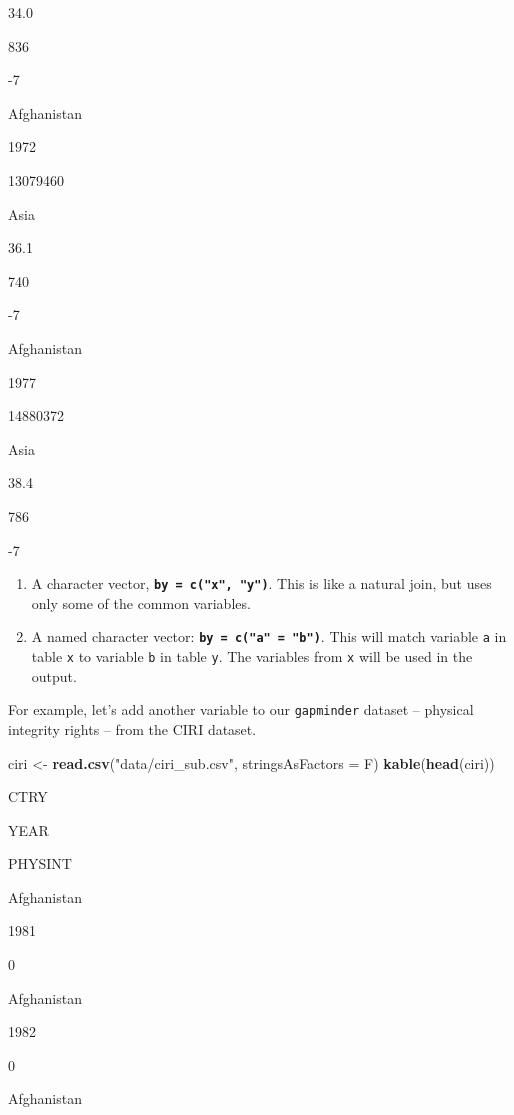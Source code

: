 \documentclass[]{book}
\newenvironment{Shaded}{\begin{snugshade}}{\end{snugshade}}
\newcommand{\KeywordTok}[1]{\textcolor[rgb]{0.13,0.29,0.53}{\textbf{#1}}}
\newcommand{\DataTypeTok}[1]{\textcolor[rgb]{0.13,0.29,0.53}{#1}}
\newcommand{\StringTok}[1]{\textcolor[rgb]{0.31,0.60,0.02}{#1}}
\newcommand{\NormalTok}[1]{#1}
\begin{document}
34.0

836

-7

Afghanistan

1972

13079460

Asia

36.1

740

-7

Afghanistan

1977

14880372

Asia

38.4

786

-7

\begin{enumerate}
\def\labelenumi{\arabic{enumi}.}
\setcounter{enumi}{1}
\item
  A character vector, \textbf{\texttt{by\ =\ c("x",\ "y")}}. This is
  like a natural join, but uses only some of the common variables.
\item
  A named character vector: \textbf{\texttt{by\ =\ c("a"\ =\ "b")}}.
  This will match variable \texttt{a} in table \texttt{x} to variable
  \texttt{b} in table \texttt{y}. The variables from \texttt{x} will be
  used in the output.
\end{enumerate}

For example, let's add another variable to our \texttt{gapminder}
dataset -- physical integrity rights -- from the CIRI dataset.

\begin{Shaded}
\begin{Highlighting}[]
\NormalTok{ciri <-}\StringTok{ }\KeywordTok{read.csv}\NormalTok{(}\StringTok{"data/ciri_sub.csv"}\NormalTok{, }\DataTypeTok{stringsAsFactors =}\NormalTok{ F)}
\KeywordTok{kable}\NormalTok{(}\KeywordTok{head}\NormalTok{(ciri))}
\end{Highlighting}
\end{Shaded}

CTRY

YEAR

PHYSINT

Afghanistan

1981

0

Afghanistan

1982

0

Afghanistan
\end{document}
